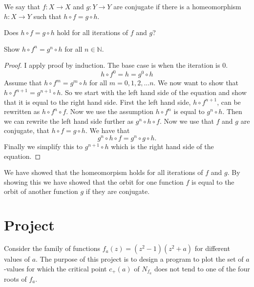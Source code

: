 \begin{definition}
We say that $f:X\to X$ and $g:Y\to Y$ are conjugate if there is a homeomorphism $h:X\to Y$ such that $h\circ f=g\circ h$.
\end{definition}
Does $h\circ f=g\circ h$ hold for all iterations of $f$ and $g$? 
\begin{theorem}
Show $h\circ f^n=g^n\circ h$ for all $n\in\mathbb{N}$. 
\end{theorem}
\begin{proof}

I apply proof by induction. The base case is when the iteration is 0.
\[h\circ f^0=h=g^0\circ h\]
Assume that $h\circ f^m=g^m\circ h$ for all $m=0,1,2,...n$. We now want to show that $h\circ f^{n+1}=g^{n+1}\circ h$. So we start with the left hand side of the equation and show that it is equal to the right hand side. First the left hand side, $h\circ f^{n+1}$, can be rewritten as $h\circ f^n\circ f$. Now we use the assumption $h\circ f^n$ is equal to $g^n\circ h$. Then we can rewrite the left hand side further as $g^n\circ h\circ f$. Now we use that $f$ and $g$ are conjugate, that $h\circ f=g\circ h$. We have that
\[g^n\circ h\circ f=g^n\circ g\circ h.\]
Finally we simplify this to $g^{n+1}\circ h$ which is the right hand side of the equation.
\end{proof}
We have showed that the homeomorpism holds for all iterations of $f$ and $g$. By showing this we have showed that the orbit for one function $f$ is equal to the orbit of another function $g$ if they are conjugate.
%

%
\newpage
\section{Project}
Consider the family of functions $f_{a}(z)=(z^2-1)(z^2+a)$ for different values of $a$. The purpose of this project is to design a program to plot the set of $a$-values for which the critical point $c_+(a)$ of $N_{f_a}$ does not tend to one of the four roots of $f_{a}$. \parencite{bae}

